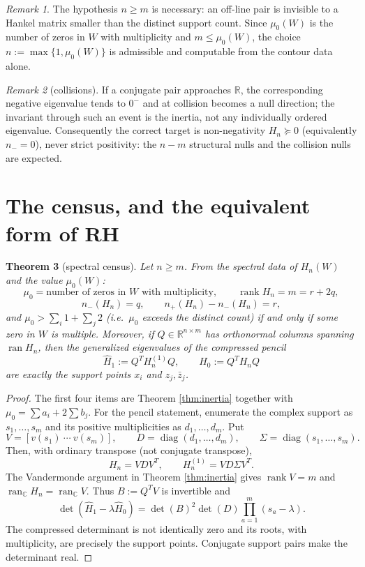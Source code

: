 \documentclass[11pt]{article}
\theoremstyle{plain}
\newtheorem{theorem}{Theorem}
\theoremstyle{definition}
\theoremstyle{remark}
\newtheorem{remark}[theorem]{Remark}
\newcommand{\R}{\mathbb{R}}
\newcommand{\C}{\mathbb{C}}
\DeclareMathOperator{\rank}{rank}
\DeclareMathOperator{\ran}{ran}
\begin{document}
\begin{remark}
The hypothesis $n \ge m$ is necessary: an off-line pair is invisible to a Hankel matrix
smaller than the distinct support count. Since $\mu_0(W)$ is the number of zeros in $W$
with multiplicity and $m \le \mu_0(W)$, the choice
$n := \max\{1,\mu_0(W)\}$ is admissible and computable from the contour data alone.
\end{remark}

\begin{remark}[collisions]
If a conjugate pair approaches $\R$, the corresponding negative eigenvalue tends to $0^-$
and at collision becomes a null direction; the invariant through such an event is the
inertia, not any individually ordered eigenvalue. Consequently the correct target is
non-negativity $H_n \succeq 0$ (equivalently $n_-=0$), never strict positivity: the
$n-m$ structural nulls and the collision nulls are expected.
\end{remark}

\section{The census, and the equivalent form of RH}

\begin{theorem}[spectral census]\label{thm:census}
Let $n \ge m$. From the spectral data of $H_n(W)$ and the value $\mu_0(W)$:
\[
  \mu_0 = \text{number of zeros in } W \text{ with multiplicity},\qquad
  \rank H_n = m = r+2q,
\]
\[
  n_-(H_n) = q,\qquad n_+(H_n)-n_-(H_n) = r,
\]
and $\mu_0 > \sum_i 1 + \sum_j 2$ (i.e.\ $\mu_0$ exceeds the distinct count) if and only
if some zero in $W$ is multiple. Moreover, if $Q\in\R^{n\times m}$ has orthonormal
columns spanning $\ran H_n$, then the generalized eigenvalues of the compressed pencil
\[
  \widehat H_1:=Q^TH_n^{(1)}Q,\qquad \widehat H_0:=Q^TH_nQ
\]
are exactly the support points $x_i$ and $z_j,\bar z_j$.
\end{theorem}

\begin{proof}
The first four items are Theorem \ref{thm:inertia} together with
$\mu_0=\sum a_i+2\sum b_j$. For the pencil statement, enumerate the complex support as
$s_1,\ldots,s_m$ and its positive multiplicities as $d_1,\ldots,d_m$. Put
\[
 V=[v(s_1)\ \cdots\ v(s_m)],\qquad
 D=\operatorname{diag}(d_1,\ldots,d_m),\qquad
 \Sigma=\operatorname{diag}(s_1,\ldots,s_m).
\]
Then, with ordinary transpose (not conjugate transpose),
\[
 H_n=VDV^T,\qquad H_n^{(1)}=VD\Sigma V^T.
\]
The Vandermonde argument in Theorem \ref{thm:inertia} gives $\rank V=m$ and
$\ran_{\C}H_n=\ran_{\C}V$. Thus $B:=Q^TV$ is invertible and
\[
 \det(\widehat H_1-\lambda\widehat H_0)
 =\det(B)^2\det(D)\prod_{a=1}^m(s_a-\lambda).
\]
The compressed determinant is not identically zero and its roots, with multiplicity,
are precisely the support points. Conjugate support pairs make the determinant real.
\end{proof}
\end{document}
